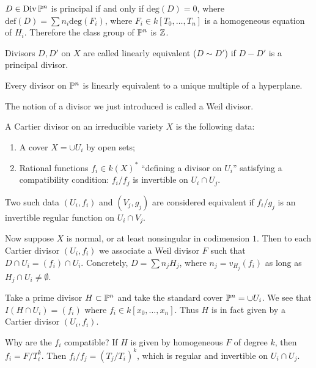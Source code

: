 \documentclass[twoside, 10pt]{article}
\begin{document}
        \begin{cor} $D \in \operatorname{Div}\P^n$ is principal if and only if
            $\mathrm{deg}(D) = 0$, where $\mathrm{def}(D) = \sum n_i
            \mathrm{deg}(F_i)$, where $F_i \in k[T_0, \ldots, T_n]$ is a
            homogeneous equation of $H_i$. Therefore the class group of $\P^n$
        is $\Z$.  \end{cor}

        \begin{defn} Divisors $D,D'$ on $X$ are called linearly equivalent ($D
        \sim D'$) if $D-D'$ is a principal divisor.  \end{defn}

        \begin{rmk} Every divisor on $\P^n$ is linearly equivalent to a unique
        multiple of a hyperplane.  \end{rmk}

        The notion of a divisor we just introduced is called a Weil divisor.

        \begin{defn} A Cartier divisor on an irreducible
            variety $X$ is the following data: \begin{enumerate} \item A cover
                $X = \cup U_i$ by open sets; \item Rational functions $f_i \in
                k(X)^*$ ``defining a divisor on $U_i$'' satisfying a
                compatibility condition: $f_i/f_j$ is invertible on $U_i \cap
        U_j$.  \end{enumerate} Two such data $(U_i,f_i)$ and $(V_j,g_j)$ are
    considered equivalent if $f_i/g_j$ is an invertible regular function on
$U_i \cap V_j$.  \end{defn}

        Now suppose $X$ is normal, or at least nonsingular in codimension $1$.
        Then to each Cartier divisor $(U_i,f_i)$ we associate a Weil divisor
        $F$ such that $D \cap U_i = (f_i) \cap U_i$. Concretely, $D = \sum
        n_jH_j$, where $n_j = v_{H_j}(f_i)$ as long as $H_j \cap U_i \neq
        \emptyset$. 

        \begin{exm} Take a prime divisor $H \subset \P^n$ and take the standard
            cover $\P^n = \cup U_i$. We see that $I(H \cap U_i) = (f_i)$ where
            $f_i \in k[x_0, \ldots, x_n]$. Thus $H$ is in fact given by a
            Cartier divisor $(U_i, f_i)$.

            Why are the $f_i$ compatible? If $H$ is given by homogeneous $F$ of
        degree $k$, then $f_i = F/T_i^k$. Then $f_i/f_j = (T_j/T_i)^k$, which
    is regular and invertible on $U_i \cap U_j$.  \end{exm}
\end{document}
